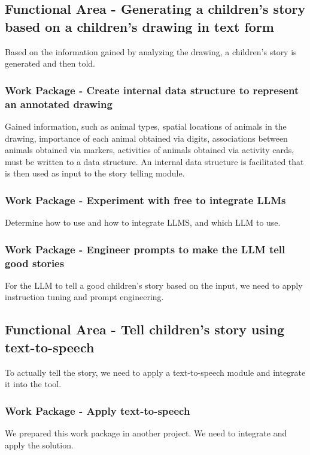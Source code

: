 \subsection{Functional Area - Generating a children's story based on a children's drawing in text form}
Based on the information gained by analyzing the drawing, a children's story is generated and then told.

\subsubsection{Work Package - Create internal data structure to represent an annotated drawing}
Gained information, such as animal types, spatial locations of animals in the drawing, importance of each animal obtained via digits, associations between animals obtained via markers, activities of animals obtained via activity cards, must be written to a data structure.
An internal data structure is facilitated that is then used as input to the story telling module.

\subsubsection{Work Package - Experiment with free to integrate LLMs}
Determine how to use and how to integrate LLMS, and which LLM to use.

\subsubsection{Work Package - Engineer prompts to make the LLM tell good stories}
For the LLM to tell a good children's story based on the input, we need to apply instruction tuning and prompt engineering.



\subsection{Functional Area - Tell children's story using text-to-speech}
To actually tell the story, we need to apply a text-to-speech module and integrate it into the tool.

\subsubsection{Work Package - Apply text-to-speech}
We prepared this work package in another project. We need to integrate and apply the solution.



